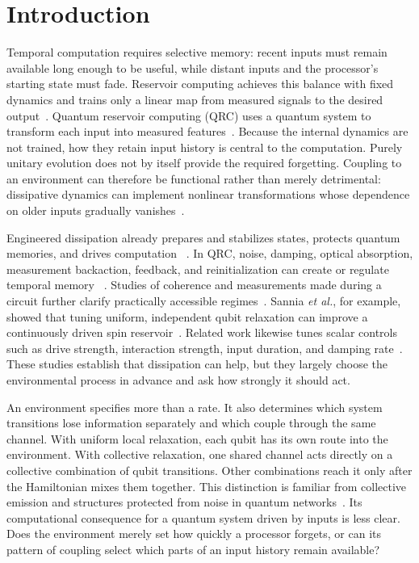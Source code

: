 \section{Introduction}
\label{sec:introduction}

Temporal computation requires selective memory: recent inputs must remain
available long enough to be useful, while distant inputs and the processor's
starting state must fade. Reservoir computing achieves this balance with fixed
dynamics and trains only a linear map from measured signals to the desired
output~\cite{Maass2002,JaegerESP2001}. Quantum reservoir computing (QRC) uses a
quantum system to transform each input into measured features~\cite{Fujii2017}.
Because the internal dynamics are not trained, how they retain input history is
central to the computation. Purely unitary evolution does not by itself provide
the required forgetting. Coupling to an environment can therefore be functional
rather than merely detrimental: dissipative dynamics can implement nonlinear
transformations whose dependence on older inputs gradually
vanishes~\cite{ChenNurdin2019}.

Engineered dissipation already prepares and stabilizes states, protects quantum
memories, and drives computation
~\cite{Poyatos1996,Verstraete2009,Pastawski2011,Harrington2022}. In QRC, noise,
damping, optical absorption, measurement backaction, feedback, and
reinitialization can create or regulate temporal memory
~\cite{Chen2020,Sannia2024,Ricci2026,Gotting2025,Mujal2023,Franceschetto2026,
KobayashiFeedback2024,Cindrak2024,SanniaNonMarkov2026,Paparelle2026}. Studies of
coherence and measurements made during a circuit further clarify practically
accessible regimes~\cite{Palacios2024,Hu2024}. Sannia \emph{et al.}, for example, showed
that tuning uniform, independent qubit relaxation can improve a continuously
driven spin reservoir~\cite{Sannia2024}. Related work likewise tunes
scalar controls such as drive strength, interaction strength, input
duration, and damping rate~\cite{MartinezPenaPRL2021,Baumann2026}. These studies
establish that dissipation can help, but they largely choose the environmental
process in advance and ask how strongly it should act.

An environment specifies more than a rate. It also determines which system
transitions lose information separately and which couple through the same
channel. With uniform local relaxation, each qubit has its own route into the
environment. With collective relaxation, one shared channel acts directly on a collective
combination of qubit transitions. Other combinations reach it only after the
Hamiltonian mixes them together. This distinction is familiar from collective
emission and structures protected from noise in quantum
networks~\cite{Dicke1954,Cabot2018}. Its computational consequence for a
quantum system driven by inputs is less clear. Does the environment merely set how
quickly a processor forgets, or can its pattern of coupling select which parts
of an input history remain available?

